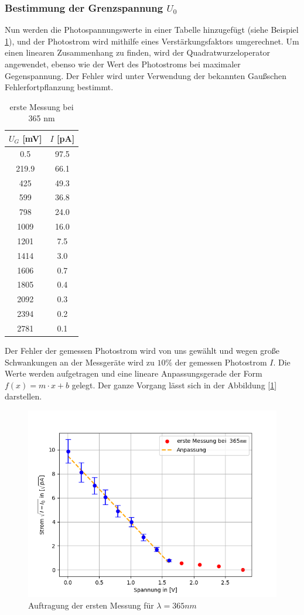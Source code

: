 \documentclass{article}
\begin{document}
\subsubsection*{Bestimmung der Grenzspannung $U_0$}
Nun werden die Photospannungswerte in einer Tabelle hinzugefügt 
(siehe Beispiel \ref{tab:messung1a}), und der Photostrom wird mithilfe 
eines Verstärkungsfaktors umgerechnet. Um einen linearen Zusammenhang zu 
finden, wird der Quadratwurzeloperator angewendet, ebenso wie der Wert des 
Photostroms bei maximaler Gegenspannung. Der Fehler wird unter Verwendung der bekannten
 Gaußschen Fehlerfortpflanzung bestimmt.

\begin{table}[h!]
  \centering
  \begin{tabular}{|c|c|}
      \hline
      $U_G$ [mV] & $I$ [pA] \\
      \hline
      0.5   & 97.5 \\
      219.9 & 66.1 \\
      425   & 49.3 \\
      599   & 36.8 \\
      798   & 24.0 \\
      1009  & 16.0 \\
      1201  & 7.5  \\
      1414  & 3.0  \\
      1606  & 0.7  \\
      1805  & 0.4  \\
      2092  & 0.3  \\
      2394  & 0.2  \\
      2781  & 0.1  \\
      \hline
  \end{tabular}
  \caption{erste Messung bei 365 nm}
  \label{tab:messung1a}
\end{table}
Der Fehler der gemessen Photostrom wird von uns gewählt und wegen große Schwankungen an der Messgeräte 
wird zu $10\%$ der gemessen Photostrom $I$.
Die Werte werden aufgetragen und eine lineare Anpassungsgerade der Form 
$f(x) = m \cdot x + b $ gelegt. Der ganze Vorgang lässt sich in der Abbildung [\ref*{fig:wellenlaenge_365nm_a}]
darstellen. 
\begin{figure}[h!]
  \centering
  \includegraphics[width=.5\linewidth]{402_365nm_a}
  \caption{Auftragung der ersten Messung für $ \lambda =365nm$}
  \label{fig:wellenlaenge_365nm_a}
\end{figure}
\newpage
\end{document}
